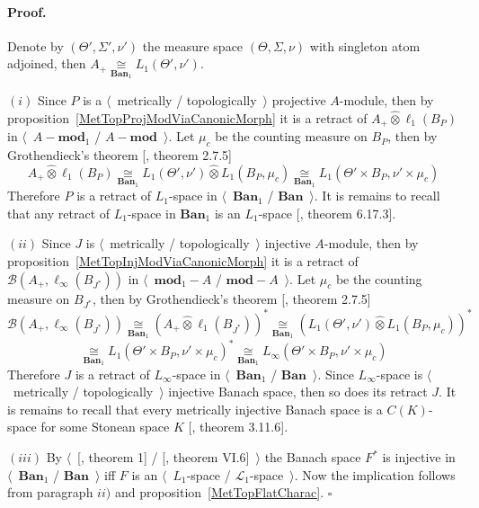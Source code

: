 \documentclass[12pt]{article}
\newcommand{\projtens}{\mathbin{\widehat{\otimes}}}
\newcommand{\isom}[1]{\mathop{\mathbin{\cong}}\limits_{#1}}
\renewenvironment{proof}{\paragraph{Proof.}}{\hfill$\square$\medskip}
\begin{document}
\begin{proof}

    Denote by $(\Theta',\Sigma',\nu')$ the measure space $(\Theta,\Sigma,\nu)$
    with singleton atom adjoined, then $A_+\isom{\mathbf{Ban}_1}
        L_1(\Theta',\nu')$.

    $(i)$ Since $P$ is a $\langle$~metrically / topologically~$\rangle$
    projective $A$-module, then by
    proposition~\ref{MetTopProjModViaCanonicMorph} it is a retract of
    $A_+\projtens \ell_1(B_P)$ in $\langle$~$A-\mathbf{mod}_1$ / $A-\mathbf{mod}$~$\rangle$. Let
    $\mu_c$ be the counting measure on $B_P$, then by Grothendieck's theorem
        [\cite{HelLectAndExOnFuncAn}, theorem 2.7.5]
    $$
        A_+\projtens\ell_1(B_P)
        \isom{\mathbf{Ban}_1}L_1(\Theta',\nu')\projtens L_1(B_P,\mu_c)
        \isom{\mathbf{Ban}_1}L_1(\Theta'\times B_P,\nu'\times \mu_c)
    $$
    Therefore $P$ is a retract of $L_1$-space in $\langle$~$\mathbf{Ban}_1$ /
    $\mathbf{Ban}$~$\rangle$. It is remains to recall that any retract of
    $L_1$-space in $\mathbf{Ban}_1$ is an $L_1$-space
    [\cite{LaceyIsomThOfClassicBanSp}, theorem 6.17.3].

    $(ii)$ Since $J$ is $\langle$~metrically / topologically~$\rangle$ injective
    $A$-module, then by proposition~\ref{MetTopInjModViaCanonicMorph} it is a
    retract of $\mathcal{B}(A_+,\ell_\infty(B_{J^*}))$ in $\langle$~$\mathbf{mod}_1-A$ /
    $\mathbf{mod}-A$~$\rangle$. Let $\mu_c$ be the counting measure on $B_{J^*}$, then
    by Grothendieck's theorem [\cite{HelLectAndExOnFuncAn}, theorem 2.7.5]
    $$
        \mathcal{B}(A_+,\ell_\infty(B_{J^*}))
        \isom{\mathbf{Ban}_1}{(A_+\projtens \ell_1(B_{J^*}))}^*
        \isom{\mathbf{Ban}_1}{(L_1(\Theta',\nu')\projtens L_1(B_P,\mu_c))}^*
    $$
    $$
        \isom{\mathbf{Ban}_1}{L_1(\Theta'\times B_P,\nu'\times \mu_c)}^*
        \isom{\mathbf{Ban}_1}L_\infty(\Theta'\times B_P,\nu'\times \mu_c)
    $$
    Therefore $J$ is a retract of $L_\infty$-space in $\langle$~$\mathbf{Ban}_1$
    / $\mathbf{Ban}$~$\rangle$. Since $L_\infty$-space is $\langle$~metrically /
    topologically~$\rangle$ injective Banach space, then so does its retract
    $J$. It is remains to recall that every metrically injective Banach space is
    a $C(K)$-space for some Stonean space $K$ [\cite{LaceyIsomThOfClassicBanSp},
            theorem 3.11.6].

    $(iii)$  By $\langle$~[\cite{GrothMetrProjFlatBanSp}, theorem 1] /
    [\cite{StegRethNucOpL1LInfSp}, theorem VI.6]~$\rangle$ the Banach space
    $F^*$ is injective in $\langle$~$\mathbf{Ban}_1$ / $\mathbf{Ban}$~$\rangle$
    iff $F$ is an $\langle$~$L_1$-space / $\mathscr{L}_1$-space~$\rangle$. Now
    the implication follows from paragraph $ii)$ and
    proposition~\ref{MetTopFlatCharac}.
\end{proof}
\end{document}
